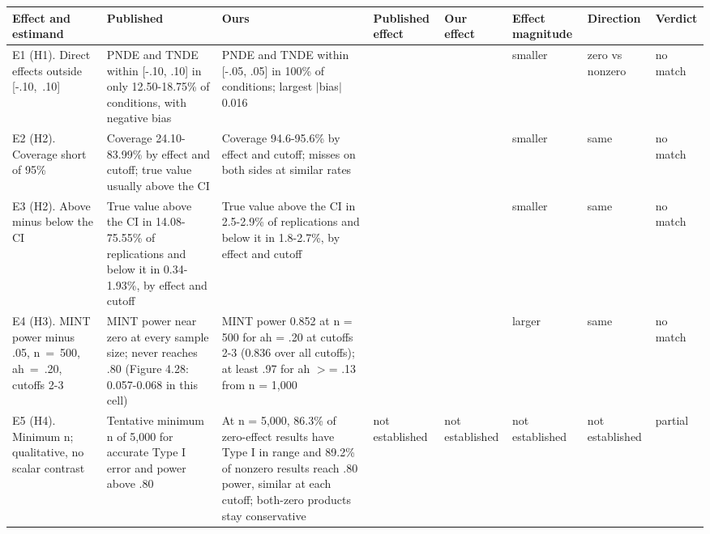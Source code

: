 \vspace{1pt}
\par\vspace{1pt}
{\scriptsize
\setlength{\tabcolsep}{3pt}\renewcommand{\arraystretch}{1.0}%
 
{\centering
\begin{tabular}{@{}>{\raggedright\arraybackslash}p{52pt}>{\raggedright\arraybackslash}p{98pt}>{\raggedright\arraybackslash}p{106pt}>{\raggedright\arraybackslash}p{41pt}>{\raggedright\arraybackslash}p{41pt}>{\raggedright\arraybackslash}p{42pt}>{\raggedright\arraybackslash}p{41pt}>{\raggedright\arraybackslash}p{31pt}@{}}
\toprule
Effect and estimand & Published & Ours & Published effect & Our effect & Effect magnitude & Direction & Verdict\\
\midrule
E1 (H1). Direct effects outside [-.10,~.10] & PNDE and TNDE within [-.10, .10] in only 12.50-18.75\% of conditions, with negative bias & PNDE and TNDE within [-.05, .05] in 100\% of conditions; largest $|$bias$|$ 0.016 & 85.42 & 0.00 & smaller & zero vs nonzero & no match\\
\midrule
E2 (H2). Coverage short of 95\% & Coverage 24.10-83.99\% by effect and cutoff; true value usually above the CI & Coverage 94.6-95.6\% by effect and cutoff; misses on both sides at similar rates & 43.62 & 0.04 & smaller & same & no match\\
\midrule
E3 (H2). Above minus below the CI & True value above the CI in 14.08-75.55\% of replications and below it in 0.34-1.93\%, by effect and cutoff & True value above the CI in 2.5-2.9\% of replications and below it in 1.8-2.7\%, by effect and cutoff & 47.07 & 0.33 & smaller & same & no match\\
\midrule
E4 (H3). MINT power minus .05, n~=~500, ah~=~.20, cutoffs 2-3 & MINT power near zero at every sample size; never reaches .80 (Figure 4.28: 0.057-0.068 in this cell) & MINT power 0.852 at n = 500 for ah = .20 at cutoffs 2-3 (0.836 over all cutoffs); at least .97 for ah $>$= .13 from n = 1,000 & 0.013 & 0.802 & larger & same & no match\\
\midrule
E5 (H4). Minimum n; qualitative, no scalar contrast & Tentative minimum n of 5,000 for accurate Type I error and power above .80 & At n = 5,000, 86.3\% of zero-effect results have Type I in range and 89.2\% of nonzero results reach .80 power, similar at each cutoff; both-zero products stay conservative & not established & not established & not established & not established & partial\\

\end{tabular}}}
